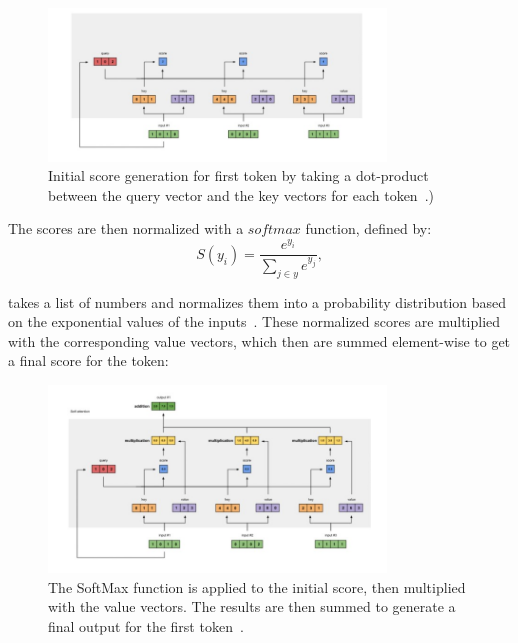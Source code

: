 \begin{figure}[h]
\centering
\includegraphics[width=0.8\textwidth]{fig/first_encoder_step.jpg}
\caption{Initial score generation for first token by taking a dot-product between the query vector and the key vectors for each token~\parencite{karim_2019}.)
}
\label{fig:first_encoder_step}
\end{figure}

The scores are then normalized with a $softmax$ function, defined by:
\begin{equation}
\label{eq:softmax}
S(y_i) = \frac{e^{y_i}}{\sum_{j\in y}e^{y_j}}, 
\end{equation}

 takes a list of numbers and normalizes them into a probability distribution based on the exponential values of the inputs~\parencite{bengio_goodfellow_courville_2017}. These normalized scores are multiplied with the corresponding value vectors, which then are summed element-wise to get a final score for the token:

\begin{figure}[H]
\centering
\includegraphics[width=0.8\textwidth]{fig/second_encoder_step.jpg}
\caption{The SoftMax function is applied to the initial score, then multiplied with the value vectors. The results are then summed to generate a final output for the first token~\parencite{karim_2019}.
}
\label{fig:second_encoder_step}
\end{figure}

